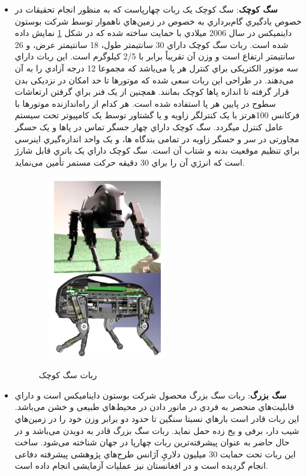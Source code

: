 \begin{itemize}
\newpage
\item
\textbf{سگ کوچک}\unskip{}:
سگ کوچک یک ربات چهارپاست که به منظور انجام تحقیقات در خصوص یادگیري گام‌برداري
\unskip{}
به خصوص در زمین‌هاي ناهموار توسط شرکت بوستون داینمیكس در سال 2006 میلادي با حمایت
\unskip{}
ساخته شده\cite{Little-Dog-1} که در شكل
\ref{ربات سگ کوچک}
نمایش داده شده است. ربات سگ کوچک داراي  30 سانتیمتر طول، 18 سانتیمتر عرض، و 26 سانتیمتر ارتفاع است و وزن آن تقریباً برابر با 2/5 کیلوگرم است\cite{Little-Dog-2}.
این ربات داراي سه موتور الكتریكی براي کنترل هر پا می‌باشد که
مجموعا 12 درجه آزادي را به آن می‌دهند. در طراحی این ربات سعی
شده که موتورها تا حد امكان در نزدیكی بدن قرار گرفته تا اندازه پاها کوچک بمانند. همچنین از یک فنر براي گرفتن ارتعاشات سطوح در
پایین هر پا استفاده شده است. هر کدام از راه‌اندازنده موتورها با فرکانس 100هرتز با یک کنترلگر
زاویه و یا گشتاور توسط یک کامپیوتر تحت سیستم عامل
کنترل میگردد. سگ کوچک داراي چهار حسگر تماس در پاها و یک حسگر مجاورتی
\unskip{}
در سر و حسگر زاویه در تمامی بندگاه ها، و یک واحد اندازه‌گیري اینرسی
\unskip{}
براي تنظیم موقعیت بدنه و شتاب آن است. سگ کوچک داراي یک باتري قابل شارژ است که انرژي آن را براي 30 دقیقه حرکت مستمر تأمین می‌نماید\cite{Little-Dog-2}.
    \begin{figure}[!h]
	\vspace{0.2cm}
	\centering
	\includegraphics[height=8cm,width=6cm]{./Images/CH1/small_dog.png}
	‌\caption[ربات سگ کوچک]{ربات سگ کوچک\cite{Little-Dog-1}}
	\label{ربات سگ کوچک}
	\end{figure}

\newpage
\item 
\textbf{سگ بزرگ}\unskip{}:
ربات سگ بزرگ محصول شرکت بوستون داینامیكس
\unskip{}
است و داراي قابلیت‌هاي منحصر به فردي در مانور دادن در محیط‌هاي طبیعی و خشن می‌باشد. این ربات قادر است بارهاي نسبتا سنگین تا حدود دو برابر وزن خود را در زمین‌هاي شیب دار، برفی و یخ زده حمل نماید. ربات سگ بزرگ قادر به دویدن می‌باشد و در حال حاضر به عنوان پیشرفته‌ترین ربات چهارپا در جهان شناخته می‌شود. ساخت این ربات تحت حمایت 30 میلیون دلاريِ آژانس طرح‌هاي پژوهشی پیشرفته دفاعی
انجام گردیده است و در افغانستان نیز عملیات آزمایشی انجام داده است. 


\end{itemize}
